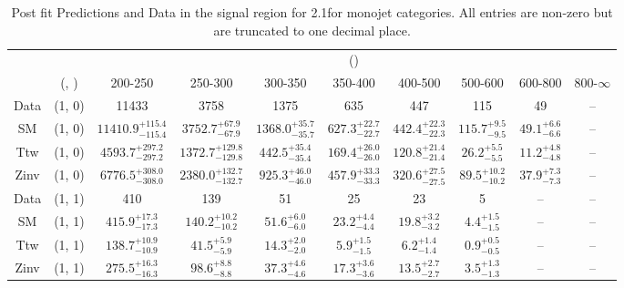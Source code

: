 \begin{table}[h!]
\tiny
\centering
\caption{Post fit Predictions and Data in the signal region for 2.1\ifb for monojet categories. All entries are non-zero but are truncated to one decimal place.\label{tab:predallpost_sig_comb_mono}}
\begin{tabular}
{cccccccccc}
	\hline\hline
	&	& \multicolumn{8}{c}{\scalht (\gev)}\\ 
	&	 (\njet, \nb) & 200-250 & 250-300 & 300-350 & 350-400 & 400-500 & 500-600 & 600-800 & 800-$\infty$ \\ [0.8ex] 
\hline
	Data & (1, 0) & 11433 & 3758 & 1375 & 635 & 447 & 115 & 49 & -- \\[0.5ex] 
	SM & (1, 0) & $11410.9^{+ 115.4 }_{- 115.4 }$ & $3752.7^{+ 67.9 }_{- 67.9 }$ & $1368.0^{+ 35.7 }_{- 35.7 }$ & $627.3^{+ 22.7 }_{- 22.7 }$ & $442.4^{+ 22.3 }_{- 22.3 }$ & $115.7^{+ 9.5 }_{- 9.5 }$ & $49.1^{+ 6.6 }_{- 6.6 }$ & -- \\[0.5ex] 
	Ttw & (1, 0) & $4593.7^{+ 297.2 }_{- 297.2 }$ & $1372.7^{+ 129.8 }_{- 129.8 }$ & $442.5^{+ 35.4 }_{- 35.4 }$ & $169.4^{+ 26.0 }_{- 26.0 }$ & $120.8^{+ 21.4 }_{- 21.4 }$ & $26.2^{+ 5.5 }_{- 5.5 }$ & $11.2^{+ 4.8 }_{- 4.8 }$ & -- \\[0.5ex] 
	Zinv & (1, 0) & $6776.5^{+ 308.0 }_{- 308.0 }$ & $2380.0^{+ 132.7 }_{- 132.7 }$ & $925.3^{+ 46.0 }_{- 46.0 }$ & $457.9^{+ 33.3 }_{- 33.3 }$ & $320.6^{+ 27.5 }_{- 27.5 }$ & $89.5^{+ 10.2 }_{- 10.2 }$ & $37.9^{+ 7.3 }_{- 7.3 }$ & -- \\[0.5ex] 
	Data & (1, 1) & 410 & 139 & 51 & 25 & 23 & 5 & -- & -- \\[0.5ex] 
	SM & (1, 1) & $415.9^{+ 17.3 }_{- 17.3 }$ & $140.2^{+ 10.2 }_{- 10.2 }$ & $51.6^{+ 6.0 }_{- 6.0 }$ & $23.2^{+ 4.4 }_{- 4.4 }$ & $19.8^{+ 3.2 }_{- 3.2 }$ & $4.4^{+ 1.5 }_{- 1.5 }$ & -- & -- \\[0.5ex] 
	Ttw & (1, 1) & $138.7^{+ 10.9 }_{- 10.9 }$ & $41.5^{+ 5.9 }_{- 5.9 }$ & $14.3^{+ 2.0 }_{- 2.0 }$ & $5.9^{+ 1.5 }_{- 1.5 }$ & $6.2^{+ 1.4 }_{- 1.4 }$ & $0.9^{+ 0.5 }_{- 0.5 }$ & -- & -- \\[0.5ex] 
	Zinv & (1, 1) & $275.5^{+ 16.3 }_{- 16.3 }$ & $98.6^{+ 8.8 }_{- 8.8 }$ & $37.3^{+ 4.6 }_{- 4.6 }$ & $17.3^{+ 3.6 }_{- 3.6 }$ & $13.5^{+ 2.7 }_{- 2.7 }$ & $3.5^{+ 1.3 }_{- 1.3 }$ & -- & -- \\[0.5ex] 
	\hline
	\hline
\end{tabular}
\end{table}

